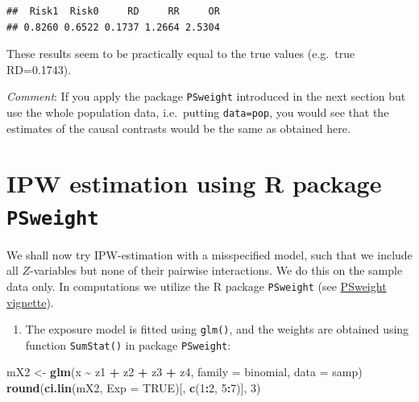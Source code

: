 \documentclass[
]{book}
\newenvironment{Shaded}{\begin{snugshade}}{\end{snugshade}}
\newcommand{\AttributeTok}[1]{\textcolor[rgb]{0.13,0.29,0.53}{#1}}
\newcommand{\ConstantTok}[1]{\textcolor[rgb]{0.56,0.35,0.01}{#1}}
\newcommand{\DecValTok}[1]{\textcolor[rgb]{0.00,0.00,0.81}{#1}}
\newcommand{\FunctionTok}[1]{\textcolor[rgb]{0.13,0.29,0.53}{\textbf{#1}}}
\newcommand{\NormalTok}[1]{#1}
\newcommand{\OtherTok}[1]{\textcolor[rgb]{0.56,0.35,0.01}{#1}}
\newcommand{\SpecialCharTok}[1]{\textcolor[rgb]{0.81,0.36,0.00}{\textbf{#1}}}
\newcounter{none} %
\providecommand{\tightlist}{%
  \setlength{\itemsep}{0pt}\setlength{\parskip}{0pt}}
\theoremstyle{definition}
\theoremstyle{definition}
\theoremstyle{definition}
\theoremstyle{definition}
\theoremstyle{remark}
\begin{document}
\begin{verbatim}
##  Risk1  Risk0     RD     RR     OR 
## 0.8260 0.6522 0.1737 1.2664 2.5304
\end{verbatim}

These results seem to be practically equal to the true values (e.g.~true
RD=0.1743).

\emph{Comment}: If you apply the package \texttt{PSweight} introduced in the next
section but
use the whole population data, i.e.~putting \texttt{data=pop}, you would see
that the estimates of the causal contrasts would be the same as obtained
here.

\section{\texorpdfstring{IPW estimation using R package \texttt{PSweight}}{IPW estimation using R package PSweight}}\label{ipw-estimation-using-r-package-psweight}

We shall now try IPW-estimation with a misspecified model, such that we
include all \(Z\)-variables but none of their pairwise interactions. We do
this on the sample data only. In computations we utilize the R package
\texttt{PSweight}
(see \href{https://cran.rstudio.com/web//packages/PSweight/vignettes/Software_vig.pdf}{PSweight vignette}).

\begin{enumerate}
\def\labelenumi{\arabic{enumi}.}
\tightlist
\item
  The exposure model is fitted using \texttt{glm()}, and the weights are
  obtained using function \texttt{SumStat()} in package \texttt{PSweight}:
\end{enumerate}

\begin{Shaded}
\begin{Highlighting}[]
\NormalTok{mX2 }\OtherTok{\textless{}{-}} \FunctionTok{glm}\NormalTok{(x }\SpecialCharTok{\textasciitilde{}}\NormalTok{ z1 }\SpecialCharTok{+}\NormalTok{ z2 }\SpecialCharTok{+}\NormalTok{ z3 }\SpecialCharTok{+}\NormalTok{ z4, }\AttributeTok{family =}\NormalTok{ binomial, }\AttributeTok{data =}\NormalTok{ samp)}
\FunctionTok{round}\NormalTok{(}\FunctionTok{ci.lin}\NormalTok{(mX2, }\AttributeTok{Exp =} \ConstantTok{TRUE}\NormalTok{)[, }\FunctionTok{c}\NormalTok{(}\DecValTok{1}\SpecialCharTok{:}\DecValTok{2}\NormalTok{, }\DecValTok{5}\SpecialCharTok{:}\DecValTok{7}\NormalTok{)], }\DecValTok{3}\NormalTok{)}
\end{Highlighting}
\end{Shaded}
\end{document}
